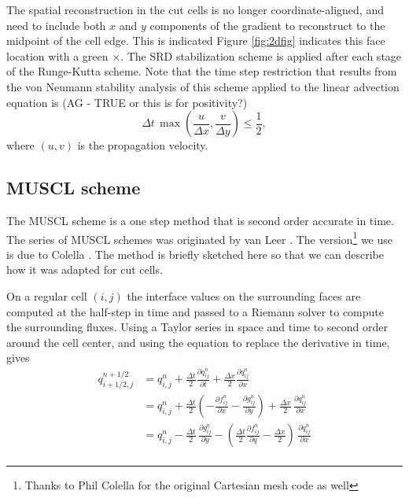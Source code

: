 The spatial reconstruction in the cut cells is no longer
coordinate-aligned, and need 
to include both $x$ and $y$ components of the gradient to 
reconstruct to the midpoint of the cell edge. This is indicated 
Figure \ref{fig:2dfig}  indicates this face location with a green $\times$.
The SRD stabilization scheme is applied after each stage of
the Runge-Kutta scheme. 
Note that the time step restriction that results from the von Neumann stability analysis of this scheme applied to the linear advection equation is  (AG -
TRUE or this is for positivity?)
\begin{equation}
\Delta t \,  \max\left(\frac{u}{\Delta x},\frac{v}{\Delta y}\right) \leq \frac{1}{2} ,
\end{equation}
where $(u,v)$ is the propagation velocity.  

\subsection{MUSCL scheme}
The MUSCL scheme is a one step method that is second order accurate in
time. The series of MUSCL schemes  was originated by van Leer 
\cite{vanleer:muscl}. The version\footnote{Thanks to Phil 
Colella for the original Cartesian mesh code as well}
we use is due to Colella \cite{Colella:Unsplit}.
The method is briefly sketched here so that we can describe how it
was adapted for cut cells.

On a regular cell $(i,j)$ the interface values on the surrounding
faces are computed at the half-step in time and passed to a Riemann
solver to compute the surrounding fluxes.
Using a Taylor series in space and time to second order around the
cell center, and using the equation to replace the derivative in time,  gives
\begin{equation}\label{taylor}
\begin{split}
q_{i+1/2,j}^{n+1/2} & = q_{i,j}^n + 
              \frac{\Delta t}{2} \frac{\partial q_{ij}^n}{\partial t} + 
              \frac{\Delta x}{2} \frac{\partial q_{ij}^n}{\partial x} \\[.1in]
            &  = q_{i,j}^n + \frac{\Delta t}{2} 
            (-\frac{\partial f_{ij}^n}{\partial x} -
             \frac{\partial g_{ij}^n}{\partial y})  +
             \frac{\Delta x}{2} \, \frac{\partial q_{ij}^n}{\partial x} \\[.1in]
            &  = q_{i,j}^n - \frac{\Delta t}{2} \, 
             \frac{\partial g_{ij}^n}{\partial y}  -
            ( \frac{\Delta t}{2} 
            \frac{\partial f_{ij}^n}{\partial q} -
             \frac{\Delta x}{2} ) \,\frac{\partial q_{ij}^n}{\partial x} \\[.1in]
\end{split}
\end{equation}

